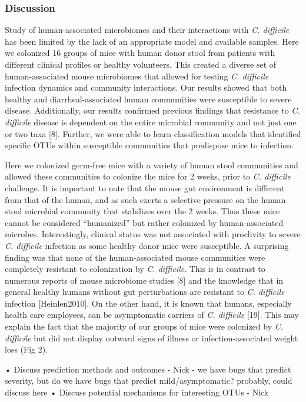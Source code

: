 \documentclass[11pt,]{article}
\begin{document}
\subsubsection{Discussion}\label{discussion}

Study of human-associated microbiomes and their interactions with
\emph{C. difficile} has been limited by the lack of an appropriate model
and available samples. Here we colonized 16 groups of mice with human
donor stool from patients with different clinical profiles or healthy
volunteers. This created a diverse set of human-associated mouse
microbiomes that allowed for testing \emph{C. difficile} infection
dynamics and community interactions. Our results showed that both
healthy and diarrheal-associated human communities were susceptible to
severe disease. Additionally, our results confirmed previous findings
that resistance to \emph{C. difficile} disease is dependent on the
entire microbial community and not just one or two taxa {[}8{]}.
Further, we were able to learn classification models that identified
specific OTUs within susceptible communities that predispose mice to
infection.

Here we colonized germ-free mice with a variety of human stool
communities and allowed these communities to colonize the mice for 2
weeks, prior to \emph{C. difficile} challenge. It is important to note
that the mouse gut environment is different from that of the human, and
as such exerts a selective pressure on the human stool microbial
community that stabilizes over the 2 weeks. Thus these mice cannot be
considered ``humanized'' but rather colonized by human-associated
microbes. Interestingly, clinical status was not associated with
proclivity to severe \emph{C. difficile} infection as some healthy donor
mice were susceptible. A surprising finding was that none of the
human-associated mouse communities were completely resistant to
colonization by \emph{C. difficile}. This is in contrast to numerous
reports of mouse microbiome studies {[}8{]} and the knowledge that in
general healthy humans without gut perturbations are resistant to
\emph{C. difficile} infection {[}Heinlen2010{]}. On the other hand, it
is known that humans, especially health care employees, can be
asymptomatic carriers of \emph{C. difficile} {[}19{]}. This may explain
the fact that the majority of our groups of mice were colonized by
\emph{C. difficile} but did not display outward signs of illness or
infection-associated weight loss (Fig 2).

• Discuss prediction methods and outcomes - Nick - we have bugs that
predict severity, but do we have bugs that predict mild/asymptomatic?
probably, could discuss here • Discuss potential mechanisms for
interesting OTUs - Nick
\end{document}
